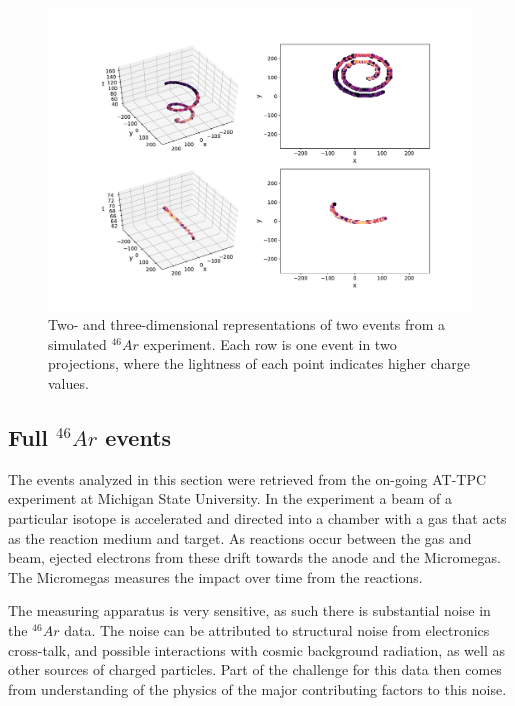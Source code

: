 \begin{figure}[H]
\centering
\includegraphics[width=\textwidth]{../plots/display_eventssimulated.pdf}
\caption[Displaying simulated events in 2D and 3D]{Two- and three-dimensional representations of two events from a simulated ${}^{46}Ar$ experiment. Each row is one event in two projections, where the lightness of each point indicates higher charge values.}\label{fig:sim_samples}
\end{figure}


\subsection{Full \texorpdfstring{${}^{46}Ar$}{46Ar}  events}\label{sec:data_real}

The events analyzed in this section were retrieved from the on-going AT-TPC experiment at Michigan State University. In the experiment a beam of a particular isotope is accelerated and directed into a chamber with a gas that acts as the reaction medium and target. As reactions occur between the gas and beam, ejected electrons from these drift towards the anode and the Micromegas. The Micromegas measures the impact over time from the reactions.

The measuring apparatus is very sensitive, as such there is substantial noise in the ${}^{46}Ar$ data. The noise can be attributed to structural noise from electronics cross-talk, and possible interactions with cosmic background radiation, as well as other sources of charged particles. Part of the challenge for this data then comes from understanding of the physics of the major contributing factors to this noise. 

